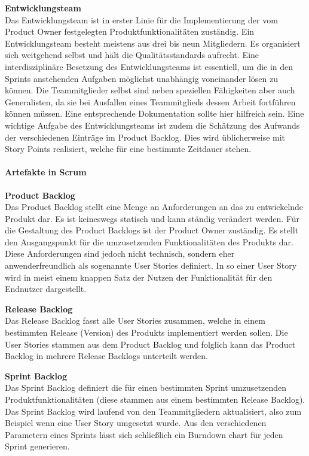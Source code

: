 \textbf{Entwicklungsteam}\\
Das Entwicklungsteam ist in erster Linie für die Implementierung der vom Product Owner festgelegten Produktfunktionalitäten zuständig. Ein Entwicklungsteam besteht meistens aus drei bis neun Mitgliedern. Es organisiert sich weitgehend selbst und hält die Qualitätsstandards aufrecht. Eine interdisziplinäre Besetzung des Entwicklungsteams ist essentiell, um die in den Sprints anstehenden Aufgaben möglichst unabhängig voneinander lösen zu können. Die Teammitglieder selbst sind neben speziellen Fähigkeiten aber auch Generalisten, da sie bei Ausfallen eines Teammitglieds dessen Arbeit fortführen können müssen. Eine entsprechende Dokumentation sollte hier hilfreich sein. Eine wichtige Aufgabe des Entwicklungsteams ist zudem die Schätzung des Aufwands der verschiedenen Einträge im Product Backlog. Dies wird üblicherweise mit Story Points realisiert, welche für eine bestimmte Zeitdauer stehen.

\paragraph{Artefakte in Scrum}
\textbf{Product Backlog}\\
Das Product Backlog stellt eine Menge an Anforderungen an das zu entwickelnde Produkt dar. Es ist keineswegs statisch und kann ständig verändert werden. Für die Gestaltung des Product Backlogs ist der Product Owner zuständig. Es stellt den Ausgangspunkt für die umzusetzenden Funktionalitäten des Produkts dar. Diese Anforderungen sind jedoch nicht technisch, sondern eher anwenderfreundlich als sogenannte User Stories definiert. In so einer User Story wird in meist einem knappen Satz der Nutzen der Funktionalität für den Endnutzer dargestellt.

\textbf{Release Backlog}\\
Das Release Backlog fasst alle User Stories zusammen, welche in einem bestimmten Release (Version) des Produkts implementiert werden sollen. Die User Stories stammen aus dem Product Backlog und folglich kann das Product Backlog in mehrere Release Backlogs unterteilt werden.

\textbf{Sprint Backlog}\\
Das Sprint Backlog definiert die für einen bestimmten Sprint umzusetzenden Produktfunktionalitäten (diese stammen aus einem bestimmten Release Backlog). Das Sprint Backlog wird laufend von den Teammitgliedern aktualisiert, also zum Beispiel wenn eine User Story umgesetzt wurde. Aus den verschiedenen Parametern eines Sprints lässt sich schließlich ein Burndown chart für jeden Sprint generieren.

